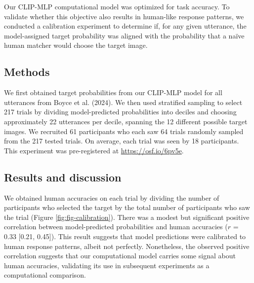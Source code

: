 \documentclass[10pt, letterpaper]{article}
\begin{document}
Our CLIP-MLP computational model was optimized for task accuracy. To
validate whether this objective also results in human-like response
patterns, we conducted a calibration experiment to determine if, for any
given utterance, the model-assigned target probability was aligned with
the probability that a naïve human matcher would choose the target
image.

\subsection{Methods}\label{methods}

We first obtained target probabilities from our CLIP-MLP model for all
utterances from Boyce et al. (2024). We then used stratified sampling to
select 217 trials by dividing model-predicted probabilities into deciles
and choosing approximately 22 utterances per decile, spanning the 12
different possible target images. We recruited 61 participants who each
saw 64 trials randomly sampled from the 217 tested trials. On average,
each trial was seen by 18 participants. This experiment was
pre-registered at \url{https://osf.io/6pv5e}.

\subsection{Results and discussion}\label{results-and-discussion}

We obtained human accuracies on each trial by dividing the number of
participants who selected the target by the total number of participants
who saw the trial (Figure \ref{fig:fig-calibration}). There was a modest
but significant positive correlation between model-predicted
probabilities and human accuracies (\(r\) = 0.33 {[}0.21, 0.45{]}). This
result suggests that model predictions were calibrated to human response
patterns, albeit not perfectly. Nonetheless, the observed positive
correlation suggests that our computational model carries some signal
about human accuracies, validating its use in subsequent experiments as
a computational comparison.
\end{document}
